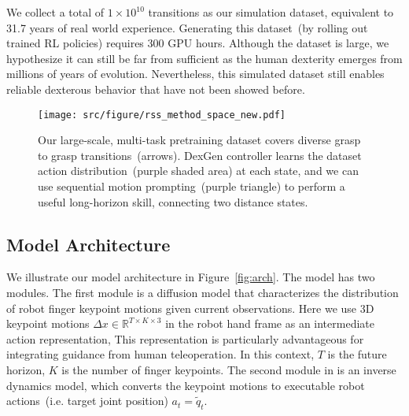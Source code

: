 We collect a total of $1\times 10^{10}$ transitions as our simulation dataset, equivalent to 31.7 years of real world experience. Generating this dataset~(by rolling out trained RL policies) requires 300 GPU hours. Although the dataset is large, we hypothesize it can still be far from sufficient as the human dexterity emerges from millions of years of evolution. Nevertheless, this simulated dataset still enables reliable dexterous behavior that have not been showed before.



\begin{figure}
    \centering
    \texttt{[image: src/figure/rss\_method\_space\_new.pdf]}
    \caption{Our large-scale, multi-task pretraining dataset covers diverse grasp to grasp transitions~(arrows). DexGen controller learns the dataset action distribution~(purple shaded area) at each state, and we can use sequential motion prompting~(purple triangle) to perform a useful long-horizon skill, connecting two distance states.}
    \label{fig:space}
    \vspace{-0.3cm}
\end{figure}

\subsection{\mname{} Model Architecture}
\label{method:arch}
We illustrate our \mname{} model architecture in Figure~\ref{fig:arch}. The \mname{} model has two modules. The first module is a diffusion model that characterizes the distribution of robot finger keypoint motions given current observations. Here we use 3D keypoint motions $\Delta x \in \mathbb{R}^{T\times K\times3}$ in the robot hand frame as an intermediate action representation, This representation is particularly advantageous for integrating guidance from human teleoperation. In this context, $T$ is the future horizon, $K$ is the number of finger keypoints. The second module in \mname{} is an inverse dynamics model, which converts the keypoint motions to executable robot actions~(i.e. target joint position) $a_t=\tilde{q}_t$.


